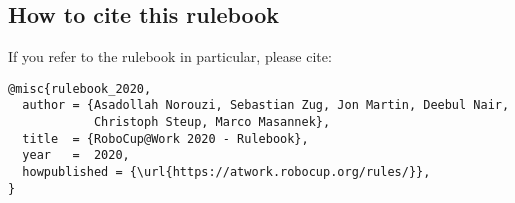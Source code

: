 \begin{titlepage}
\section*{How to cite this rulebook}

If you refer to the rulebook in particular, please cite:


\begin{verbatim}
@misc{rulebook_2020,
  author = {Asadollah Norouzi, Sebastian Zug, Jon Martin, Deebul Nair,
            Christoph Steup, Marco Masannek},
  title  = {RoboCup@Work 2020 - Rulebook},
  year   =  2020,
  howpublished = {\url{https://atwork.robocup.org/rules/}},
}
\end{verbatim}

\end{titlepage}
